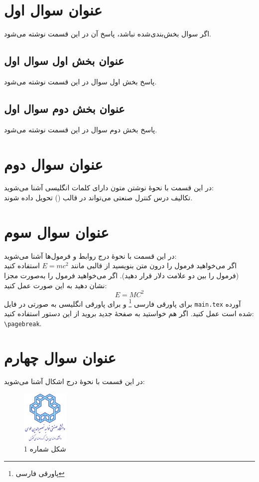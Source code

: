 \documentclass{article}
\begin{document}


\tableofcontents
\newpage

\section{عنوان سوال اول}\label{Section1}
اگر سوال بخش‌بندی‌شده نباشد، پاسخ آن در این قسمت نوشته می‌شود.
\subsection{عنوان بخش اول سوال اول}
پاسخ بخش اول سوال در این قسمت نوشته می‌شود.
\subsection{عنوان بخش دوم سوال اول}
پاسخ بخش دوم سوال در این قسمت نوشته می‌شود.

\section{عنوان سوال دوم}
در این قسمت با نحوۀ نوشتن متون دارای کلمات انگلیسی آشنا می‌شوید:\\
\indent %
تکالیف درس کنترل صنعتی می‌تواند در قالب
\lr{\LaTeX} ()
تحویل داده شوند.

\section{عنوان سوال سوم}
در این قسمت با نحوۀ درج روابط و فرمول‌ها آشنا می‌شوید:\\
\indent %
اگر می‌خواهید فرمول را درون متن بنویسید از قالبی مانند
$E = m{c}^{2}$
استفاده کنید (فرمول را بین دو علامت دلار قرار دهید).
اگر می‌خواهید فرمول را به‌صورت مجزا نشان دهید به این صورت عمل کنید:
\begin{equation}\label{eq1}
E=M C^2
\end{equation}
برای پاورقی فارسی%
\footnote{پاورقی فارسی}
و برای پاورقی انگلیسی%
به صورتی در فایل \verb|main.tex| آورده شده است عمل کنید.
اگر هم خواستید به صفحۀ جدید بروید از این دستور استفاده کنید: \verb|\pagebreak|.
\pagebreak
\section{عنوان سوال چهارم}
در این قسمت با نحوۀ درج اشکال آشنا می‌شوید:
\begin{figure}[h!]
    \centering
    \includegraphics[width=0.2\textwidth]{KNTULogo.pdf}
    \caption{شکل شماره 1}
    \label{fig1}
\end{figure}
\end{document}
